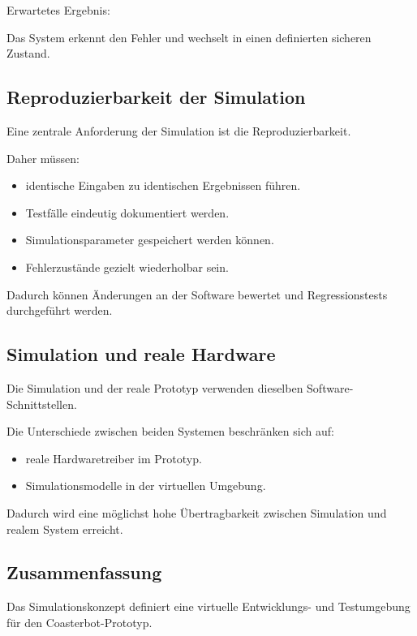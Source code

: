 \documentclass[
  a4paper,
  12pt,
  DIV=12,        %
  parskip=half,  %
  headings=small %
]{scrartcl}
\theoremstyle{definition}
\providecommand{\tightlist}{%
  \setlength{\itemsep}{0pt}\setlength{\parskip}{0pt}}
\theoremstyle{definition}
\begin{document}
Erwartetes Ergebnis:

Das System erkennt den Fehler und wechselt in einen definierten sicheren
Zustand.

\subsection{Reproduzierbarkeit der
Simulation}\label{reproduzierbarkeit-der-simulation}

Eine zentrale Anforderung der Simulation ist die Reproduzierbarkeit.

Daher müssen:

\begin{itemize}
\tightlist
\item
  identische Eingaben zu identischen Ergebnissen führen.
\item
  Testfälle eindeutig dokumentiert werden.
\item
  Simulationsparameter gespeichert werden können.
\item
  Fehlerzustände gezielt wiederholbar sein.
\end{itemize}

Dadurch können Änderungen an der Software bewertet und Regressionstests
durchgeführt werden.

\subsection{Simulation und reale
Hardware}\label{simulation-und-reale-hardware}

Die Simulation und der reale Prototyp verwenden dieselben
Software-Schnittstellen.

Die Unterschiede zwischen beiden Systemen beschränken sich auf:

\begin{itemize}
\tightlist
\item
  reale Hardwaretreiber im Prototyp.
\item
  Simulationsmodelle in der virtuellen Umgebung.
\end{itemize}

Dadurch wird eine möglichst hohe Übertragbarkeit zwischen Simulation und
realem System erreicht.

\subsection{Zusammenfassung}\label{zusammenfassung-4}

Das Simulationskonzept definiert eine virtuelle Entwicklungs- und
Testumgebung für den Coasterbot-Prototyp.
\end{document}
